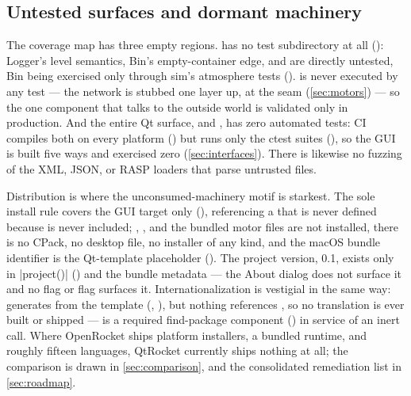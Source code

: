 \subsection{Untested surfaces and dormant machinery}\label{sec:testing-gaps}

The coverage map has three empty regions.  has no test subdirectory at all
(): Logger's level semantics, Bin's empty-container edge, and
 are directly untested, Bin being exercised only through sim's
atmosphere tests (). 
is never executed by any test --- the network is stubbed one layer up, at the
 seam (\cref{sec:motors}) --- so the one component that talks to the
outside world is validated only in production. And the entire Qt surface,  and
, has zero automated tests: CI compiles both on every platform
() but runs only the ctest suites
(), so the GUI is built five ways and
exercised zero (\cref{sec:interfaces}). There is likewise no fuzzing of the XML, JSON, or
RASP loaders that parse untrusted files.

Distribution is where the unconsumed-machinery motif is starkest. The sole install rule
covers the GUI target only (), referencing a
 that is never defined because  is never
included; , , and the bundled 
motor files are not installed, there is no CPack, no desktop file, no installer of any
kind, and the macOS bundle identifier is the Qt-template placeholder
 (). The project version, 0.1, exists only in
\cppinline|project()| () and the bundle metadata --- the About dialog does not surface it and no  flag
or  flag surfaces it. Internationalization is vestigial in the same way:
 generates  from the template
 (, ), but
nothing references , so no translation is ever built or shipped ---
 is a required find-package component () in
service of an inert call. Where OpenRocket ships platform installers, a bundled runtime, and
roughly fifteen languages, QtRocket currently ships nothing at all; the comparison is drawn
in \cref{sec:comparison}, and the consolidated remediation list in \cref{sec:roadmap}.
